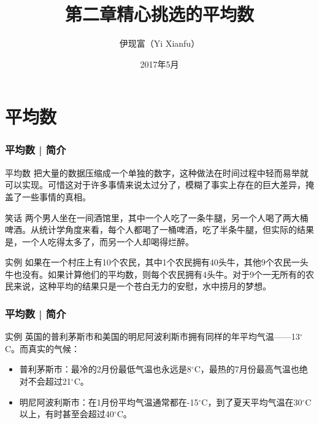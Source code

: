 



\title[平均数]{第二章\quad 精心挑选的平均数}
\author[Yixf]{伊现富（Yi Xianfu）}
\date{2017年5月}



\section{平均数}
\begin{frame}
  \frametitle{平均数 | 简介}
  \begin{block}{平均数}
把大量的数据压缩成一个单独的数字，这种做法在时间过程中轻而易举就可以实现。可惜这对于许多事情来说太过分了，模糊了事实上存在的巨大差异，掩盖了一些事情的真相。
  \end{block}
  \pause
  \begin{block}{笑话}
两个男人坐在一间酒馆里，其中一个人吃了一条牛腿，另一个人喝了两大桶啤酒。从统计学角度来看，每个人都喝了一桶啤酒，吃了半条牛腿，但实际的结果是，一个人吃得太多了，而另一个人却喝得烂醉。
  \end{block}
  \pause
  \begin{block}{实例}
如果在一个村庄上有10个农民，其中1个农民拥有40头牛，其他9个农民一头牛也没有。如果计算他们的平均数，则每个农民拥有4头牛。对于9个一无所有的农民来说，这种平均的结果只是一个苍白无力的安慰，水中捞月的梦想。
  \end{block}
\end{frame}

\begin{frame}
  \frametitle{平均数 | 简介}
  \begin{block}{实例}
    英国的普利茅斯市和美国的明尼阿波利斯市拥有同样的年平均气温——13$^{\circ}$C。而真实的气候：
    \begin{itemize}
      \item 普利茅斯市：最冷的2月份最低气温也永远是8$^{\circ}$C，最热的7月份最高气温也绝对不会超过21$^{\circ}$C。
      \item 明尼阿波利斯市：在1月份平均气温通常都在-15$^{\circ}$C，到了夏天平均气温在30$^{\circ}$C以上，有时甚至会超过40$^{\circ}$C。
    \end{itemize}
  \end{block}
\end{frame}

